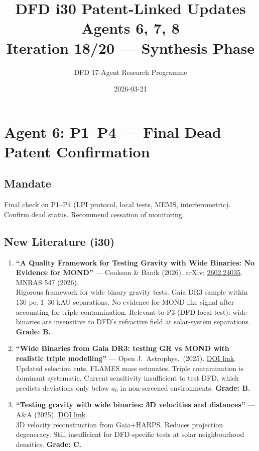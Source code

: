 \documentclass[11pt,a4paper]{article}
\title{DFD i30 Patent-Linked Updates\\Agents 6, 7, 8\\[6pt]\large Iteration 18/20 --- Synthesis Phase}
\author{DFD 17-Agent Research Programme}
\date{2026-03-21}
\begin{document}
\maketitle
\tableofcontents
\newpage

\section{Agent 6: P1--P4 --- Final Dead Patent Confirmation}

\subsection{Mandate}
Final check on P1--P4 (LPI protocol, local tests, MEMS, interferometric). Confirm dead status. Recommend cessation of monitoring.

\subsection{New Literature (i30)}

\begin{enumerate}
\item \textbf{``A Quality Framework for Testing Gravity with Wide Binaries: No Evidence for MOND''} --- Cookson \& Banik (2026). arXiv: \href{https://arxiv.org/abs/2602.24035}{2602.24035}. MNRAS 547 (2026).\\
Rigorous framework for wide binary gravity tests. Gaia DR3 sample within 130 pc, 1--30 kAU separations. No evidence for MOND-like signal after accounting for triple contamination. Relevant to P3 (DFD local test): wide binaries are insensitive to DFD's refractive field at solar-system separations. \textbf{Grade: B.}

\item \textbf{``Wide Binaries from Gaia DR3: testing GR vs MOND with realistic triple modelling''} --- Open J.\ Astrophys.\ (2025). \href{https://astro.theoj.org/article/142887}{DOI link}.\\
Updated selection cuts, FLAMES mass estimates. Triple contamination is dominant systematic. Current sensitivity insufficient to test DFD, which predicts deviations only below $a_0$ in non-screened environments. \textbf{Grade: B.}

\item \textbf{``Testing gravity with wide binaries: 3D velocities and distances''} --- A\&A (2025). \href{https://www.aanda.org/articles/aa/full_html/2025/07/aa55115-25/aa55115-25.html}{DOI link}.\\
3D velocity reconstruction from Gaia+HARPS. Reduces projection degeneracy. Still insufficient for DFD-specific tests at solar neighbourhood densities. \textbf{Grade: C.}
\end{enumerate}
\end{document}
